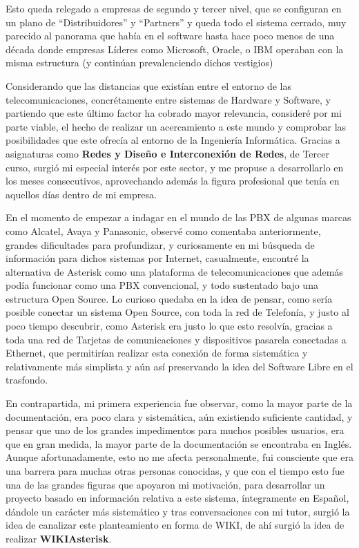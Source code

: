 Esto queda relegado a empresas de segundo y tercer nivel, que se configuran en un plano de ``Distribuidores'' y ``Partners'' y queda todo el sistema cerrado, muy parecido al panorama que había en el software hasta hace poco menos de una década donde empresas Líderes como Microsoft, Oracle, o IBM operaban con la misma estructura (y continúan prevalenciendo dichos vestigios)

Considerando que las distancias que existían entre el entorno de las telecomunicaciones, concrétamente entre sistemas de Hardware y Software, y partiendo que este último factor ha cobrado mayor relevancia, consideré por mi parte viable, el hecho de realizar un acercamiento a este mundo y comprobar las posibilidades que este ofrecía al entorno de la Ingeniería Informática. Gracias a asignaturas como \textbf{Redes y Diseño e Interconexión de Redes}, de Tercer curso, surgió mi especial interés por este sector, y me propuse a desarrollarlo en los meses consecutivos, aprovechando además la figura profesional que tenía en aquellos días dentro de mi empresa.

En el momento de empezar a indagar en el mundo de las PBX de algunas marcas como Alcatel, Avaya y Panasonic, observé como comentaba anteriormente, grandes dificultades para profundizar, y curiosamente en mi búsqueda de información para dichos sistemas por Internet, casualmente, encontré la alternativa de Asterisk como una plataforma de telecomunicaciones que además podía funcionar como una PBX convencional, y todo sustentado bajo una estructura Open Source. Lo curioso quedaba en la idea de pensar, como sería posible conectar un sistema Open Source, con toda la red de Telefonía, y justo al poco tiempo descubrir, como Asterisk era justo lo que esto resolvía, gracias a toda una red de Tarjetas de comunicaciones y dispositivos pasarela conectadas a Ethernet, que permitirían realizar esta conexión de forma sistemática y relativamente más simplista y aún así preservando la idea del Software Libre en el trasfondo.

En contrapartida, mi primera experiencia fue observar, como la mayor parte de la documentación, era poco clara y sistemática, aún existiendo suficiente cantidad, y pensar que uno de los grandes impedimentos para muchos posibles usuarios, era que en gran medida, la mayor parte de la documentación se encontraba en Inglés. Aunque afortunadamente, esto no me afecta personalmente, fui consciente que era una barrera para muchas otras personas conocidas, y que con el tiempo esto fue una de las grandes figuras que apoyaron mi motivación, para desarrollar un proyecto basado en información relativa a este sistema, íntegramente en Español, dándole un carácter más sistemático y tras conversaciones con mi tutor, surgió la idea de canalizar este planteamiento en forma de WIKI, de ahí surgió la idea de realizar \textbf{WIKIAsterisk}.

